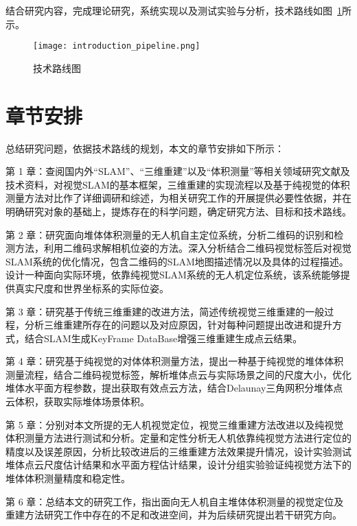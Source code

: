 结合研究内容，完成理论研究，系统实现以及测试实验与分析，技术路线如图~\ref{fig:introduction_pipeline}所示。
\begin{figure}[H] %
  \centering
  \texttt{[image: introduction\_pipeline.png]}
  \caption{技术路线图}
  \label{fig:introduction_pipeline}
\end{figure}
\section{章节安排}
\label{sec:1.5}
总结研究问题，依据技术路线的规划，本文的章节安排如下所示：

第 1 章：查阅国内外“SLAM”、“三维重建”以及“体积测量”等相关领域研究文献及技术资料，对视觉SLAM的基本框架，三维重建的实现流程以及基于纯视觉的体积测量方法对比作了详细调研和综述，为相关研究工作的开展提供必要性依据，并在明确研究对象的基础上，提炼存在的科学问题，确定研究方法、目标和技术路线。

第 2 章：研究面向堆体体积测量的无人机自主定位系统，分析二维码的识别和检测方法，利用二维码求解相机位姿的方法。深入分析结合二维码视觉标签后对视觉SLAM系统的优化情况，包含二维码的SLAM地图描述情况以及具体的过程描述。设计一种面向实际环境，依靠纯视觉SLAM系统的无人机定位系统，该系统能够提供真实尺度和世界坐标系的实际位姿。

第 3 章：研究基于传统三维重建的改进方法，简述传统视觉三维重建的一般过程，分析三维重建所存在的问题以及对应原因，针对每种问题提出改进和提升方式，结合SLAM生成KeyFrame DataBase增强三维重建生成点云结果。

第 4 章：研究基于纯视觉的对体体积测量方法，提出一种基于纯视觉的堆体体积测量流程，结合二维码视觉标签，解析堆体点云与实际场景之间的尺度大小，优化堆体水平面方程参数，提出获取有效点云方法，结合Delaunay三角网积分堆体点云体积，获取实际堆体场景体积。

第 5 章：分别对本文所提的无人机视觉定位，视觉三维重建方法改进以及纯视觉体积测量方法进行测试和分析。定量和定性分析无人机依靠纯视觉方法进行定位的精度以及误差原因，分析比较改进后的三维重建方法效果提升情况，设计实验测试堆体点云尺度估计结果和水平面方程估计结果，设计分组实验验证纯视觉方法下的堆体体积测量精度和稳定性。

第 6 章：总结本文的研究工作，指出面向无人机自主堆体体积测量的视觉定位及重建方法研究工作中存在的不足和改进空间，并为后续研究提出若干研究方向。